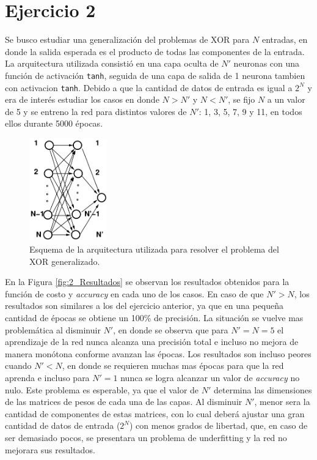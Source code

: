 \section*{Ejercicio 2}
\graphicspath{{Figuras/}}

Se busco estudiar una generalización del problemas de XOR para $N$ entradas, en donde la salida esperada es el producto de todas las componentes de la entrada. La arquitectura utilizada consistió en una capa oculta de $N'$ neuronas con una función de activación \texttt{tanh}, seguida de una capa de salida de 1 neurona tambien con activacion \texttt{tanh}. Debido a que la cantidad de datos de entrada es igual a $2^{N}$ y era de interés estudiar los casos en donde $N>N'$ y $N<N'$, se fijo $N$ a un valor de 5 y se entreno la red para distintos valores de $N'$: 1, 3, 5, 7, 9 y 11, en todos ellos durante 5000 épocas.

\begin{figure}[h!]
    \centering
    \includegraphics[width=0.3\textwidth]{Figuras/ejer_2_NN1.png}
    \caption{Esquema de la arquitectura utilizada para resolver el problema del XOR generalizado.}
    \label{02:fig:Arquitectura}
\end{figure}

En la Figura \ref{fig:2_Resultados} se observan los resultados obtenidos para la función de costo y \textit{accuracy} en cada uno de los casos. En caso de que $N'>N$, los resultados son similares a los del ejercicio anterior, ya que en una pequeña cantidad de épocas se obtiene un 100\% de precisión. La situación se vuelve mas problemática al disminuir $N'$, en donde se observa que para $N'=N=5$ el aprendizaje de la red nunca alcanza una precisión total e incluso no mejora de manera monótona conforme avanzan las épocas. Los resultados son incluso peores cuando $N'<N$, en donde se requieren muchas mas épocas para que la red aprenda e incluso para $N'=1$ nunca se logra alcanzar un valor de \textit{accuracy} no nulo. Este problema es esperable, ya que el valor de $N'$ determina las dimensiones de las matrices de pesos de cada una de las capas. Al disminuir $N'$, menor sera la cantidad de componentes de estas matrices, con lo cual deberá ajustar una gran cantidad de datos de entrada ($2^{N}$) con menos grados de libertad, que, en caso de ser demasiado pocos, se presentara un problema de underfitting y la red no mejorara sus resultados.


